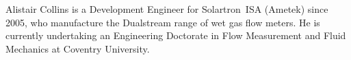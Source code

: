 \documentclass[journal]{IEEEtran}
\begin{document}
\vspace*{\fill}
\begin{IEEEbiographynophoto}{Alistair Collins}
is a Development Engineer for Solartron~ISA (Ametek) since 2005, who manufacture the Dualstream range of wet gas flow meters.  He is currently undertaking an Engineering Doctorate in Flow Measurement and Fluid Mechanics at Coventry University.
\end{IEEEbiographynophoto}
\end{document}
